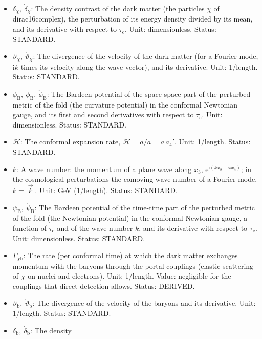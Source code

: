 \documentclass[
  10pt,
]{article}
\providecommand{\tightlist}{%
  \setlength{\itemsep}{0pt}\setlength{\parskip}{0pt}}
\begin{document}
\begin{itemize}
\tightlist
\item
  \(\delta_\chi,\ \dot\delta_\chi\): The density contrast of the dark
  matter (the particles \(\chi\) of dirac16complex), the perturbation of
  its energy density divided by its mean, and its derivative with
  respect to \(\tau_{\mathrm{c}}\). Unit: dimensionless. Status:
  STANDARD.
\item
  \(\vartheta_\chi,\ \dot\vartheta_\chi\): The divergence of the
  velocity of the dark matter (for a Fourier mode, \(\mathrm{i}k\) times
  its velocity along the wave vector), and its derivative. Unit:
  1/length. Status: STANDARD.
\item
  \(\phi_{\mathrm{B}},\ \dot\phi_{\mathrm{B}},\ \ddot\phi_{\mathrm{B}}\):
  The Bardeen potential of the space-space part of the perturbed metric
  of the fold (the curvature potential) in the conformal Newtonian
  gauge, and its first and second derivatives with respect to
  \(\tau_{\mathrm{c}}\). Unit: dimensionless. Status: STANDARD.
\item
  \(\mathcal{H}\): The conformal expansion rate,
  \(\mathcal{H} = \dot a/a = a\,a_4'\). Unit: 1/length. Status:
  STANDARD.
\item
  \(k\): A wave number: the momentum of a plane wave along \(x_3\),
  \(\mathrm{e}^{\mathrm{i}(kx_3 - \omega x_4)}\); in the cosmological
  perturbations the comoving wave number of a Fourier mode,
  \(k = \lvert\vec k\rvert\). Unit: GeV (1/length). Status: STANDARD.
\item
  \(\psi_{\mathrm{B}},\ \dot\psi_{\mathrm{B}}\): The Bardeen potential
  of the time-time part of the perturbed metric of the fold (the
  Newtonian potential) in the conformal Newtonian gauge, a function of
  \(\tau_{\mathrm{c}}\) and of the wave number \(k\), and its derivative
  with respect to \(\tau_{\mathrm{c}}\). Unit: dimensionless. Status:
  STANDARD.
\item
  \(\Gamma_{\chi\mathrm{b}}\): The rate (per conformal time) at which
  the dark matter exchanges momentum with the baryons through the portal
  couplings (elastic scattering of \(\chi\) on nuclei and electrons).
  Unit: 1/length. Value: negligible for the couplings that direct
  detection allows. Status: DERIVED.
\item
  \(\vartheta_{\mathrm{b}},\ \dot\vartheta_{\mathrm{b}}\): The
  divergence of the velocity of the baryons and its derivative. Unit:
  1/length. Status: STANDARD.
\item
  \(\delta_{\mathrm{b}},\ \dot\delta_{\mathrm{b}}\): The density

\end{itemize}
\end{document}

